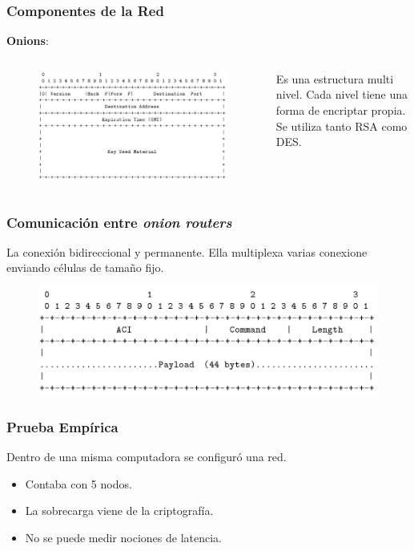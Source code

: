 \documentclass{beamer}
\newcommand{\vspc}{\vspace{0.5cm}}
\begin{document}
\begin{frame}
    \frametitle{Componentes de la Red}
   
    \textbf{Onions}:
    \begin{columns}
            \begin{figure}
            \centering
                \includegraphics[scale=0.18]{onionConecct.png}
            \end{figure}
        
        Es una estructura multi nivel. Cada nivel tiene una forma de encriptar propia. Se utiliza tanto RSA como DES.
    \end{columns}
\end{frame}

\begin{frame}
    \frametitle{Comunicación entre \textit{onion routers}}

    La conexión bidireccional y permanente. Ella multiplexa varias conexione enviando células de tamaño fijo.

    \begin{figure}[h]
        \centering
        \includegraphics[scale=0.3]{cell.png}
    \end{figure}
\end{frame}

\begin{frame}
    \frametitle{Prueba Empírica}

    Dentro de una misma computadora se configuró una red.

    \vspc

    \begin{itemize}
        \item Contaba con 5 nodos.
        \item La sobrecarga viene de la criptografía.
        \item No se puede medir nociones de latencia.
    \end{itemize}
\end{frame}
\end{document}
